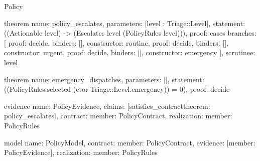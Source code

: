 \begin{lexlean}{Policy}
\begin{semanticmodule}
theorem{
  name: policy_escalates,
  parameters: [level : Triage::Level],
  statement: ((Actionable level) -> (Escalates level (PolicyRules level))),
  proof: cases{
    branches: [
      {proof: decide{}, binders: [], constructor: routine},
      {proof: decide{}, binders: [], constructor: urgent},
      {proof: decide{}, binders: [], constructor: emergency}
    ],
    scrutinee: level
  }
}

theorem{
  name: emergency_dispatches,
  parameters: [],
  statement: ((PolicyRules.selected (ctor Triage::Level.emergency)) = 0),
  proof: decide{}
}

evidence{
  name: PolicyEvidence,
  claims: [satisfies_contract{theorem: policy_escalates}],
  contract: {member: PolicyContract},
  realization: {member: PolicyRules}
}

model{
  name: PolicyModel,
  contract: {member: PolicyContract},
  evidence: [{member: PolicyEvidence}],
  realization: {member: PolicyRules}
}
\end{semanticmodule}
\end{lexlean}
